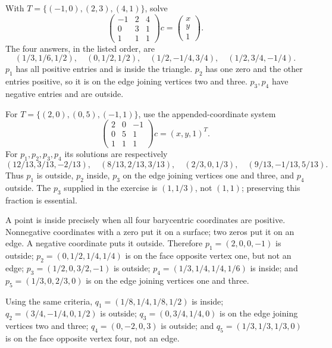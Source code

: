 With $T=\{(-1,0),(2,3),(4,1)\}$, solve
\[
 \begin{pmatrix}-1&2&4\\0&3&1\\1&1&1\end{pmatrix}c
 =\begin{pmatrix}x\\y\\1\end{pmatrix}.
\]
The four answers, in the listed order, are
\[
 (1/3,1/6,1/2),\quad(0,1/2,1/2),\quad
 (1/2,-1/4,3/4),\quad(1/2,3/4,-1/4).
\]
$p_1$ has all positive entries and is inside the triangle.
$p_2$ has one zero and the other entries positive, so it is on the edge
joining vertices two and three. $p_3,p_4$ have negative entries and are outside.

For $T=\{(2,0),(0,5),(-1,1)\}$, use the appended-coordinate system
\[
 \begin{pmatrix}2&0&-1\\0&5&1\\1&1&1\end{pmatrix}c=(x,y,1)^T.
\]
For $p_1,p_2,p_3,p_4$ its solutions are respectively
\[
 (12/13,3/13,-2/13),\quad(8/13,2/13,3/13),\quad
 (2/3,0,1/3),\quad(9/13,-1/13,5/13).
\]
Thus $p_1$ is outside, $p_2$ inside, $p_3$ on the edge joining vertices
one and three, and $p_4$ outside. The $p_3$ supplied in the exercise is
$(1,1/3)$, not $(1,1)$; preserving this fraction is essential.

A point is inside precisely when all four barycentric coordinates are
positive. Nonnegative coordinates with a zero put it on a surface; two
zeros put it on an edge. A negative coordinate puts it outside.
Therefore $p_1=(2,0,0,-1)$ is outside;
$p_2=(0,1/2,1/4,1/4)$ is on the face opposite vertex one, but not an edge;
$p_3=(1/2,0,3/2,-1)$ is outside;
$p_4=(1/3,1/4,1/4,1/6)$ is inside; and
$p_5=(1/3,0,2/3,0)$ is on the edge joining vertices one and three.

Using the same criteria, $q_1=(1/8,1/4,1/8,1/2)$ is inside;
$q_2=(3/4,-1/4,0,1/2)$ is outside;
$q_3=(0,3/4,1/4,0)$ is on the edge joining vertices two and three;
$q_4=(0,-2,0,3)$ is outside; and
$q_5=(1/3,1/3,1/3,0)$ is on the face opposite vertex four, not an edge.

